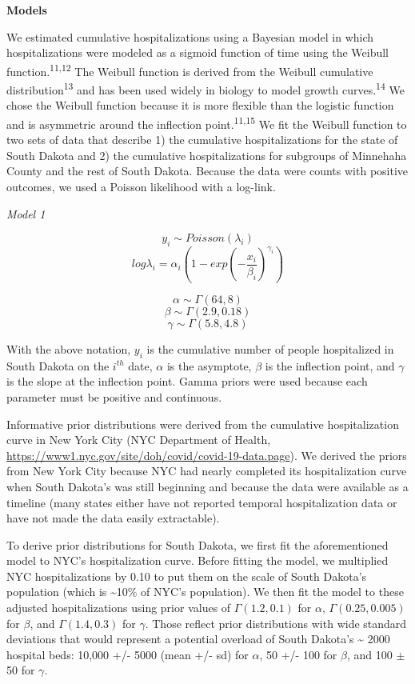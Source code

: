 \documentclass[
]{article}
\begin{document}
\textbf{Models}

We estimated cumulative hospitalizations using a Bayesian model in which hospitalizations were modeled as a sigmoid function of time using the Weibull function.\textsuperscript{11,12} The Weibull function is derived from the Weibull cumulative distribution\textsuperscript{13} and has been used widely in biology to model growth curves.\textsuperscript{14} We chose the Weibull function because it is more flexible than the logistic function and is asymmetric around the inflection point.\textsuperscript{11,15} We fit the Weibull function to two sets of data that describe 1) the cumulative hospitalizations for the state of South Dakota and 2) the cumulative hospitalizations for subgroups of Minnehaha County and the rest of South Dakota. Because the data were counts with positive outcomes, we used a Poisson likelihood with a log-link.

\emph{Model 1}

\[y_i \sim Poisson(\lambda_i)\]
\[log\lambda_i = \alpha_i(1 - exp(-\frac{x_i}{\beta_i})^{\gamma_i})\]

\[\alpha \sim \Gamma(64,8)\]
\[\beta \sim \Gamma(2.9, 0.18)\]
\[\gamma \sim \Gamma(5.8,4.8)\]

With the above notation, \(y_i\) is the cumulative number of people hospitalized in South Dakota on the \(i^{th}\) date, \(\alpha\) is the asymptote, \(\beta\) is the inflection point, and \(\gamma\) is the slope at the inflection point. Gamma priors were used because each parameter must be positive and continuous.

Informative prior distributions were derived from the cumulative hospitalization curve in New York City (NYC Department of Health, \url{https://www1.nyc.gov/site/doh/covid/covid-19-data.page}). We derived the priors from New York City because NYC had nearly completed its hospitalization curve when South Dakota's was still beginning and because the data were available as a timeline (many states either have not reported temporal hospitalization data or have not made the data easily extractable).

To derive prior distributions for South Dakota, we first fit the aforementioned model to NYC's hospitalization curve. Before fitting the model, we multiplied NYC hospitalizations by 0.10 to put them on the scale of South Dakota's population (which is \textasciitilde10\% of NYC's population). We then fit the model to these adjusted hospitalizations using prior values of \(\Gamma(1.2, 0.1)\) for \(\alpha\), \(\Gamma(0.25, 0.005)\) for \(\beta\), and \(\Gamma(1.4, 0.3)\) for \(\gamma\). Those reflect prior distributions with wide standard deviations that would represent a potential overload of South Dakota's \textasciitilde{} 2000 hospital beds: 10,000 +/- 5000 (mean +/- sd) for \(\alpha\), 50 +/- 100 for \(\beta\), and 100 \(\pm\) 50 for \(\gamma\).
\end{document}
